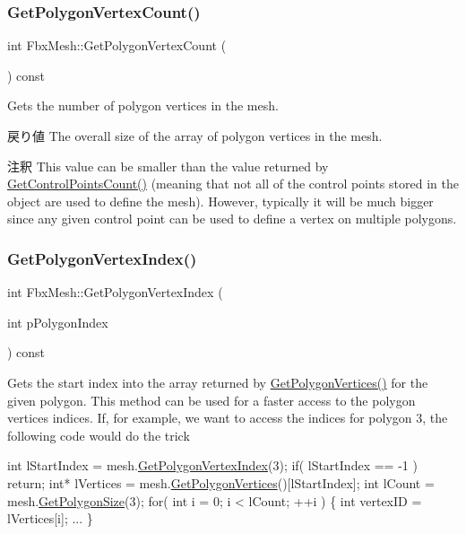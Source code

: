 \subsubsection{\texorpdfstring{Get\+Polygon\+Vertex\+Count()}{GetPolygonVertexCount()}}
{\footnotesize\ttfamily int Fbx\+Mesh\+::\+Get\+Polygon\+Vertex\+Count (\begin{DoxyParamCaption}{ }\end{DoxyParamCaption}) const}

Gets the number of polygon vertices in the mesh. \begin{DoxyReturn}{戻り値}
The overall size of the array of polygon vertices in the mesh. 
\end{DoxyReturn}
\begin{DoxyRemark}{注釈}
This value can be smaller than the value returned by \hyperlink{class_fbx_geometry_base_aa9f42ae6a958036722670143fabf3b17}{Get\+Control\+Points\+Count()} (meaning that not all of the control points stored in the object are used to define the mesh). However, typically it will be much bigger since any given control point can be used to define a vertex on multiple polygons. 
\end{DoxyRemark}
\mbox{\label{class_fbx_mesh_a942e182a7c27fa11464b9adb0c9cdc3b}} 
\subsubsection{\texorpdfstring{Get\+Polygon\+Vertex\+Index()}{GetPolygonVertexIndex()}}
{\footnotesize\ttfamily int Fbx\+Mesh\+::\+Get\+Polygon\+Vertex\+Index (\begin{DoxyParamCaption}\item[{int}]{p\+Polygon\+Index }\end{DoxyParamCaption}) const}

Gets the start index into the array returned by \hyperlink{class_fbx_mesh_a0c29a17dfc1db3644772acb5c32a63b0}{Get\+Polygon\+Vertices()} for the given polygon. This method can be used for a faster access to the polygon vertices indices. If, for example, we want to access the indices for polygon 3, the following code would do the trick 
\begin{DoxyCode}
\textcolor{keywordtype}{int} lStartIndex = mesh.\hyperlink{class_fbx_mesh_a942e182a7c27fa11464b9adb0c9cdc3b}{GetPolygonVertexIndex}(3);
\textcolor{keywordflow}{if}( lStartIndex == -1 ) \textcolor{keywordflow}{return};
\textcolor{keywordtype}{int}* lVertices = mesh.\hyperlink{class_fbx_mesh_a0c29a17dfc1db3644772acb5c32a63b0}{GetPolygonVertices}()[lStartIndex];
\textcolor{keywordtype}{int} lCount = mesh.\hyperlink{class_fbx_mesh_a775d0e10dc67bbcb9f7368d828588e55}{GetPolygonSize}(3);
\textcolor{keywordflow}{for}( \textcolor{keywordtype}{int} i = 0; i < lCount; ++i )
\{
    \textcolor{keywordtype}{int} vertexID = lVertices[i];
    ...
\}
\end{DoxyCode}
 
